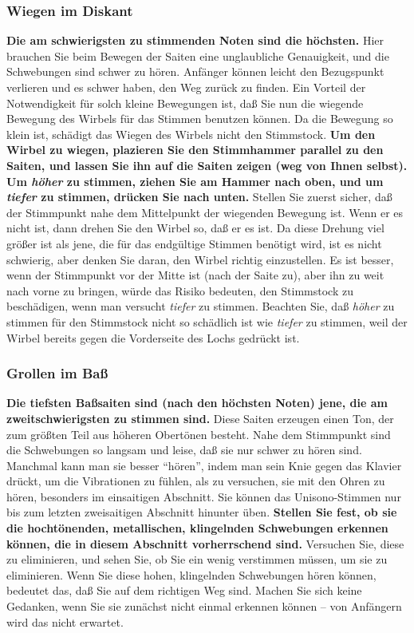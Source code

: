 \subsubsection{Wiegen im Diskant}
\label{c2_5_disk}

\textbf{Die am schwierigsten zu stimmenden Noten sind die höchsten.}
Hier brauchen Sie beim Bewegen der Saiten eine unglaubliche Genauigkeit, und die Schwebungen sind schwer zu hören.
Anfänger können leicht den Bezugspunkt verlieren und es schwer haben, den Weg zurück zu finden.
Ein Vorteil der Notwendigkeit für solch kleine Bewegungen ist, daß Sie nun die wiegende Bewegung des Wirbels für das Stimmen benutzen können.
Da die Bewegung so klein ist, schädigt das Wiegen des Wirbels nicht den Stimmstock.
\textbf{Um den Wirbel zu wiegen, plazieren Sie den Stimmhammer parallel zu den Saiten, und lassen Sie ihn auf die Saiten zeigen (weg von Ihnen selbst).
Um \textit{höher} zu stimmen, ziehen Sie am Hammer nach oben, und um \textit{tiefer} zu stimmen, drücken Sie nach unten.}
Stellen Sie zuerst sicher, daß der Stimmpunkt nahe dem Mittelpunkt der wiegenden Bewegung ist.
Wenn er es nicht ist, dann drehen Sie den Wirbel so, daß er es ist.
Da diese Drehung viel größer ist als jene, die für das endgültige Stimmen benötigt wird, ist es nicht schwierig, aber denken Sie daran, den Wirbel richtig einzustellen.
Es ist besser, wenn der Stimmpunkt vor der Mitte ist (nach der Saite zu), aber ihn zu weit nach vorne zu bringen, würde das Risiko bedeuten, den Stimmstock zu beschädigen, wenn man versucht \textit{tiefer} zu stimmen.
Beachten Sie, daß \textit{höher} zu stimmen für den Stimmstock nicht so schädlich ist wie \textit{tiefer} zu stimmen, weil der Wirbel bereits gegen die Vorderseite des Lochs gedrückt ist.
 

\label{c2_5i}
\subsubsection{Grollen im Baß}
\label{c2_5_bass}

\textbf{Die tiefsten Baßsaiten sind (nach den höchsten Noten) jene, die am zweitschwierigsten zu stimmen sind.}
Diese Saiten erzeugen einen Ton, der zum größten Teil aus höheren Obertönen besteht.
Nahe dem Stimmpunkt sind die Schwebungen so langsam und leise, daß sie nur schwer zu hören sind.
Manchmal kann man sie besser \enquote{hören}, indem man sein Knie gegen das Klavier drückt, um die Vibrationen zu fühlen, als zu versuchen, sie mit den Ohren zu hören, besonders im einsaitigen Abschnitt.
Sie können das Unisono-Stimmen nur bis zum letzten zweisaitigen Abschnitt hinunter üben.
\textbf{Stellen Sie fest, ob sie die hochtönenden, metallischen, klingelnden Schwebungen erkennen können, die in diesem Abschnitt vorherrschend sind.}
Versuchen Sie, diese zu eliminieren, und sehen Sie, ob Sie ein wenig verstimmen müssen, um sie zu eliminieren.
Wenn Sie diese hohen, klingelnden Schwebungen hören können, bedeutet das, daß Sie auf dem richtigen Weg sind.
Machen Sie sich keine Gedanken, wenn Sie sie zunächst nicht einmal erkennen können -- von Anfängern wird das nicht erwartet.
 

